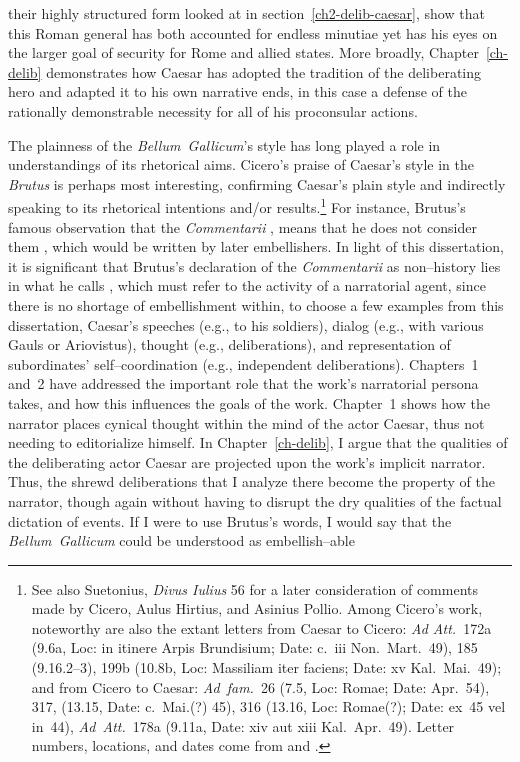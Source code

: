 \documentclass[12pt,letterpaper,oneside,final]{memoir}
\begin{document}
their highly structured form looked at in section~\ref{ch2-delib-caesar}, show that this Roman general has both accounted for endless minutiae yet has his eyes on the larger goal of security for Rome and allied states. More broadly, Chapter~\ref{ch-delib} demonstrates how Caesar has adopted the tradition of the deliberating hero and adapted it to his own narrative ends, in this case a defense of the rationally demonstrable necessity for all of his proconsular actions.

The plainness of the \emph{Bellum~Gallicum}'s style has long played a role in understandings of its rhetorical aims. Cicero's praise of Caesar's style in the \emph{Brutus} is perhaps most interesting, confirming Caesar's plain style and indirectly speaking to its rhetorical intentions and/or results.\footnote{See also Suetonius, \emph{Divus Iulius} 56 for a later consideration of comments made by Cicero, Aulus Hirtius, and Asinius Pollio. Among Cicero's work, noteworthy are also the extant letters from Caesar to Cicero: \emph{Ad Att.}~172a (9.6a, Loc: \textlatin{in itinere Arpis Brundisium}; Date: c.~iii Non.~Mart.~49), 185 (9.16.2--3), 199b (10.8b, Loc: \textlatin{Massiliam iter faciens}; Date: xv Kal.~Mai.~49); and from Cicero to Caesar: \emph{Ad~fam.}~26 (7.5, Loc: Romae; Date: Apr.~54), 317, (13.15, Date: c.~Mai.(?) 45), 316 (13.16, Loc: Romae(?); Date: ex~45 vel in~44), \emph{Ad~Att.}~178a (9.11a, Date: xiv aut xiii Kal.~Apr.~49). Letter numbers, locations, and dates come from \textcite{shackletonbailey1965} and \textcite{shackletonbailey1977}.} For instance, Brutus's famous observation that the \emph{Commentarii} , means that he does not consider them , which would be written by later embellishers. In light of this dissertation, it is significant that Brutus's declaration of the \emph{Commentarii} as non--history lies in what he calls , which must refer to the activity of a narratorial agent, since there is no shortage of embellishment within, to choose a few examples from this dissertation, Caesar's speeches (e.g., to his soldiers), dialog (e.g., with various Gauls or Ariovistus), thought (e.g., deliberations), and representation of subordinates' self--coordination (e.g., independent deliberations). Chapters~1 and~2 have addressed the important role that the work's narratorial persona takes, and how this influences the goals of the work. Chapter~1 shows how the narrator places cynical thought within the mind of the actor Caesar, thus not needing to editorialize himself. In Chapter~\ref{ch-delib}, I argue that the qualities of the deliberating actor Caesar are projected upon the work's implicit narrator. Thus, the shrewd deliberations that I analyze there become the property of the narrator, though again without having to disrupt the dry qualities of the factual dictation of events. If I were to use Brutus's words, I would say that the \emph{Bellum~Gallicum} could be understood as embellish--able 
\end{document}
